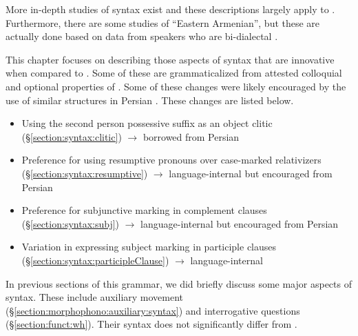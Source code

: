\begin{sloppypar}
More in-depth   studies of {{\seaSEA}} syntax exist \citep{DumTragut-2009-ArmenianReferenceGrammar,Yeghiazaryan-2010-ArmenianCase,Su-2012-syntaxFunctionalProjectionsvPPeriphery,Hodgson-2019-DissRelativeClauseArmenianSyntax,KhurshudayanDonabedian-2021-FocusStrategiesAndCleftConstructionsModerArmenain} and these descriptions largely apply to {{\iaIA}}.  Furthermore, there are some studies of ``Eastern Armenian'', but these are actually done based on data from {{\iaIA}} speakers who are bi-dialectal \citep{Stevick-1955-SyntaxColloquailEasternArmenian,Tamrazian-1994-ArmenianSyntax,Megerdoomian-2009-ThesisBook}.
\end{sloppypar}

This chapter focuses on describing those aspects of {{\iaIA}} syntax that are innovative when compared to {\seaSE}. Some of these are grammaticalized from attested colloquial and optional properties of  {{\seaSEA}}. Some of these changes were likely encouraged by the use of similar structures in Persian \citep[cf. other language-contact effects in the region:][]{donabedianSitaridou-2021-anatolia}. These changes are listed below. 

	\begin{itemize}
		\item  Using the second person possessive suffix   as an object clitic  (\S\ref{section:syntax:clitic}) $\rightarrow$ borrowed from Persian
		\item  Preference for using resumptive pronouns over case-marked relativizers  (\S\ref{section:syntax:resumptive}) $\rightarrow$ lan\-guage-internal but encouraged   from Persian
		\item  Preference for subjunctive marking  in complement clauses   (\S\ref{section:syntax:subj}) $\rightarrow$ lan\-guage-internal but encouraged   from Persian
		\item  Variation in expressing subject marking in participle clauses  (\S\ref{section:syntax:participleClause}) $\rightarrow$ lan\-guage-internal 
	\end{itemize}
	
In previous sections of this grammar, we did briefly discuss some major aspects of {{\iaIA}} syntax. These include   auxiliary movement (\S\ref{section:morphophono:auxiliary:syntax}) and interrogative questions (\S\ref{section:funct:wh}). Their syntax does not significantly differ from {\seaSEA}. 

